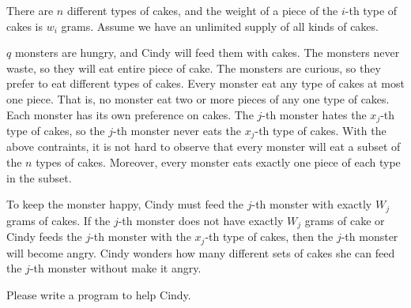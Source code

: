 There are $n$ different types of cakes, 
and the weight of a piece of the $i$-th type of cakes is $w_i$ grams.
Assume we have an unlimited supply of all kinds of cakes.

$q$ monsters are hungry, and Cindy will feed them with cakes.
The monsters never waste, so they will eat entire piece of cake.
The monsters are curious, so they prefer to eat different types of cakes. 
Every monster eat any type of cakes at most one piece. 
That is, no monster eat two or more pieces of any one type of cakes.
Each monster has its own preference on cakes.
The $j$-th monster hates the $x_j$-th type of cakes, so
the $j$-th monster never eats the $x_j$-th type of cakes.
With the above contraints, it is not hard to observe that every monster will 
eat a subset of the $n$ types of cakes. Moreover, every monster eats exactly
one piece of each type in the subset. 

To keep the monster happy, Cindy must feed the $j$-th monster with 
exactly $W_j$ grams of cakes. If the $j$-th monster does not have exactly $W_j$
grams of cake or Cindy feeds the $j$-th monster with the $x_j$-th type of cakes,
then the $j$-th monster will become angry.
Cindy wonders how many different sets of cakes she can feed the $j$-th monster 
without make it angry.

Please write a program to help Cindy.
